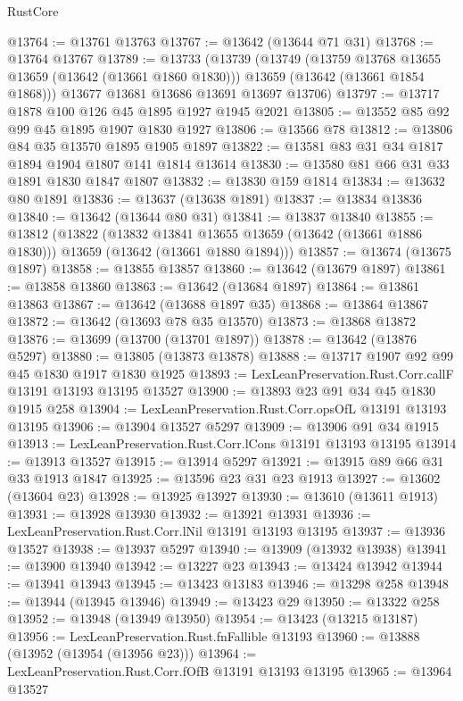 \begin{lexlean}{RustCore}
\begin{coremodule}
@13764 := @13761 @13763
@13767 := @13642 (@13644 @71 @31)
@13768 := @13764 @13767
@13789 := @13733
    (@13739
      (@13749
        (@13759 @13768 @13655 @13659 (@13642 (@13661 @1860 @1830)))
        @13659
        (@13642 (@13661 @1854 @1868)))
      @13677
      @13681
      @13686
      @13691
      @13697
      @13706)
@13797 := @13717 @1878 @100 @126 @45 @1895 @1927 @1945 @2021
@13805 := @13552 @85 @92 @99 @45 @1895 @1907 @1830 @1927
@13806 := @13566 @78
@13812 := @13806 @84 @35 @13570 @1895 @1905 @1897
@13822 := @13581 @83 @31 @34 @1817 @1894 @1904 @1807 @141 @1814 @13614
@13830 := @13580 @81 @66 @31 @33 @1891 @1830 @1847 @1807
@13832 := @13830 @159 @1814
@13834 := @13632 @80 @1891
@13836 := @13637 (@13638 @1891)
@13837 := @13834 @13836
@13840 := @13642 (@13644 @80 @31)
@13841 := @13837 @13840
@13855 := @13812
    (@13822
      (@13832 @13841 @13655 @13659 (@13642 (@13661 @1886 @1830)))
      @13659
      (@13642 (@13661 @1880 @1894)))
@13857 := @13674 (@13675 @1897)
@13858 := @13855 @13857
@13860 := @13642 (@13679 @1897)
@13861 := @13858 @13860
@13863 := @13642 (@13684 @1897)
@13864 := @13861 @13863
@13867 := @13642 (@13688 @1897 @35)
@13868 := @13864 @13867
@13872 := @13642 (@13693 @78 @35 @13570)
@13873 := @13868 @13872
@13876 := @13699 (@13700 (@13701 @1897))
@13878 := @13642 (@13876 @5297)
@13880 := @13805 (@13873 @13878)
@13888 := @13717 @1907 @92 @99 @45 @1830 @1917 @1830 @1925
@13893 := LexLeanPreservation.Rust.Corr.callF @13191 @13193 @13195 @13527
@13900 := @13893 @23 @91 @34 @45 @1830 @1915 @258
@13904 := LexLeanPreservation.Rust.Corr.opsOfL @13191 @13193 @13195
@13906 := @13904 @13527 @5297
@13909 := @13906 @91 @34 @1915
@13913 := LexLeanPreservation.Rust.Corr.lCons @13191 @13193 @13195
@13914 := @13913 @13527
@13915 := @13914 @5297
@13921 := @13915 @89 @66 @31 @33 @1913 @1847
@13925 := @13596 @23 @31 @23 @1913
@13927 := @13602 (@13604 @23)
@13928 := @13925 @13927
@13930 := @13610 (@13611 @1913)
@13931 := @13928 @13930
@13932 := @13921 @13931
@13936 := LexLeanPreservation.Rust.Corr.lNil @13191 @13193 @13195
@13937 := @13936 @13527
@13938 := @13937 @5297
@13940 := @13909 (@13932 @13938)
@13941 := @13900 @13940
@13942 := @13227 @23
@13943 := @13424 @13942
@13944 := @13941 @13943
@13945 := @13423 @13183
@13946 := @13298 @258
@13948 := @13944 (@13945 @13946)
@13949 := @13423 @29
@13950 := @13322 @258
@13952 := @13948 (@13949 @13950)
@13954 := @13423 (@13215 @13187)
@13956 := LexLeanPreservation.Rust.fnFallible @13193
@13960 := @13888 (@13952 (@13954 (@13956 @23)))
@13964 := LexLeanPreservation.Rust.Corr.fOfB @13191 @13193 @13195
@13965 := @13964 @13527

\end{coremodule}
\end{lexlean}
